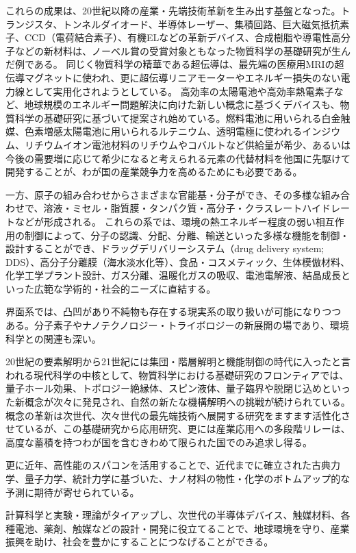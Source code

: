 これらの成果は、20世紀以降の産業・先端技術革新を生み出す基盤となった。トランジスタ、トンネルダイオード、半導体レーザー、集積回路、巨大磁気抵抗素子、CCD（電荷結合素子）、有機ELなどの革新デバイス、合成樹脂や導電性高分子などの新材料は、ノーベル賞の受賞対象ともなった物質科学の基礎研究が生んだ例である。
同じく物質科学の精華である超伝導は、最先端の医療用MRIの超伝導マグネットに使われ、更に超伝導リニアモーターやエネルギー損失のない電力線として実用化されようとしている。
高効率の太陽電池や高効率熱電素子など、地球規模のエネルギー問題解決に向けた新しい概念に基づくデバイスも、物質科学の基礎研究に基づいて提案され始めている。燃料電池に用いられる白金触媒、色素増感太陽電池に用いられるルテニウム、透明電極に使われるインジウム、リチウムイオン電池材料のリチウムやコバルトなど供給量が希少、あるいは今後の需要増に応じて希少になると考えられる元素の代替材料を他国に先駆けて開発することが、わが国の産業競争力を高めるためにも必要である。

一方、原子の組み合わせからさまざまな官能基・分子ができ、その多様な組み合わせで、溶液・ミセル・脂質膜・タンパク質・高分子・クラスレートハイドレートなどが形成される。
これらの系では、環境の熱エネルギー程度の弱い相互作用の制御によって、分子の認識、分配、分離、輸送といった多様な機能を制御・設計することができ、ドラッグデリバリーシステム（drug delivery system; DDS）、高分子分離膜（海水淡水化等）、食品・コスメティック、生体模倣材料、化学工学プラント設計、ガス分離、温暖化ガスの吸収、電池電解液、結晶成長といった広範な学術的・社会的ニーズに直結する。

界面系では、凸凹があり不純物も存在する現実系の取り扱いが可能になりつつある。分子素子やナノテクノロジー・トライボロジーの新展開の場であり、環境科学との関連も深い。

20世紀の要素解明から21世紀には集団・階層解明と機能制御の時代に入ったと言われる現代科学の中核として、物質科学における基礎研究のフロンティアでは、量子ホール効果、トポロジー絶縁体、スピン液体、量子臨界や脱閉じ込めといった新概念が次々に発見され、自然の新たな機構解明への挑戦が続けられている。
概念の革新は次世代、次々世代の最先端技術へ展開する研究をますます活性化させているが、この基礎研究から応用研究、更には産業応用への多段階リレーは、高度な蓄積を持つわが国を含むきわめて限られた国でのみ追求し得る。

更に近年、高性能のスパコンを活用することで、近代までに確立された古典力学、量子力学、統計力学に基づいた、ナノ材料の物性・化学のボトムアップ的な予測に期待が寄せられている。

計算科学と実験・理論がタイアップし、次世代の半導体デバイス、触媒材料、各種電池、薬剤、触媒などの設計・開発に役立てることで、地球環境を守り、産業振興を助け、社会を豊かにすることにつなげることができる。

